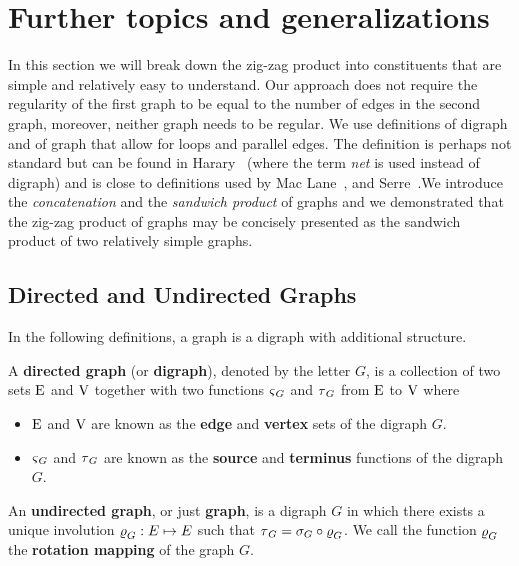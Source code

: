 
\chapter{Further topics and generalizations}
\label{chapt:new}

In this section we will break down the zig-zag product into constituents that are simple and relatively easy to understand. Our approach does not require the regularity of the first graph to be equal to the number of edges in the second graph, moreover, neither graph needs to be regular. We use  definitions of digraph and of graph that  allow for loops and parallel edges. The definition is perhaps not standard but can be found in Harary~\cite{Harary:1966} (where the term {\it net} is used instead of digraph) and is close to definitions used by {Mac Lane}~\cite{Lane:1971ys}, and Serre~\cite{Serre:1980}.We  introduce the {\em concatenation} and the {\em sandwich product} of graphs and we demonstrated that the zig-zag product of graphs may be concisely presented as the sandwich product of two relatively simple graphs.

\section{Directed and Undirected Graphs} 
\label{sec:direct-undir-graphs}
In the following definitions, a graph is a digraph with additional structure.

\begin{definition}
\label{def:digraph}
A {\bf directed graph} (or {\bf digraph}), denoted by the letter $G$, is a collection of two sets $\mathrm{E}$ and $\mathrm{V}$ together with two functions $\operatorname{\mathbf{\varsigma}}_G$ and $\operatorname{\mathbf{\tau}}_G$ from $\mathrm{E}$ to $\mathrm{V}$ where  
\begin{itemize}
\item $\mathrm{E}$ and $\mathrm{V}$ are known as the {\bf edge} and {\bf vertex} sets of the digraph $G$.
\item $\operatorname{\mathbf{\varsigma}}_G$ and $\operatorname{\mathbf{\tau}}_G$ are known as the {\bf source} and {\bf terminus} functions of the digraph $G$.
\end{itemize}
\end{definition}

\begin{definition} 
An \textbf{undirected graph}, or just \textbf{graph},  is a digraph $G$ in which there exists a unique involution $\operatorname{\mathbf{\varrho}}_{G}:E \mapsto E$ such that $\operatorname{\mathbf{\tau}}_G = \sigma_G \circ \operatorname{\mathbf{\varrho}}_G$. We call the function $\operatorname{\mathbf{\varrho}}_G$ the {\bf rotation mapping} of the graph $G$.
\end{definition}

